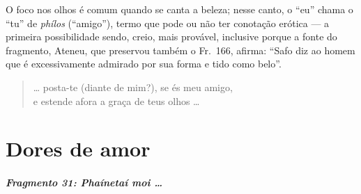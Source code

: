 {\small O foco nos olhos é comum quando se canta a beleza; nesse canto, o “eu” chama o
“tu” de \textit{phílos }(``amigo”), termo que pode ou não ter conotação
erótica --- a primeira possibilidade sendo, creio, mais provável, inclusive
porque a fonte do fragmento, Ateneu, que preservou também o Fr.~166, afirma:
``Safo diz ao homem que é excessivamente admirado por sua forma e tido como belo''.}

\begin{verse}
\ldots{} posta-te (diante de mim?), se és meu amigo,\\
e estende afora a graça de teus olhos \ldots{}
\end{verse}


\chapter{Dores de amor}

\paragraph{Fragmento 31: \textit{Phaínetaí moi \ldots{}}}


